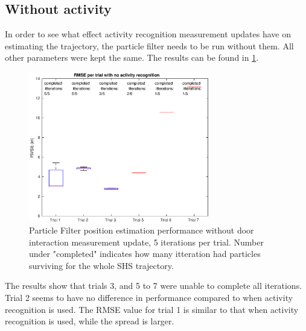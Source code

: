 \newpage
\subsection{Without activity}
In order to see what effect activity recognition measurement updates have on estimating the trajectory, the particle filter needs to be run without them. All other parameters were kept the same. The results can be found in \cref{fig:pf_boxplot_no_doors}.

\begin{figure}[H]
	\centering
	\includegraphics[width=0.7\textwidth]{images/20201118_1507_RMSE_per_trial_with_no_activity_recognition}
	\caption[Particle Filter position estimation performance without door interaction]{Particle Filter position estimation performance without door interaction measurement update, 5 iterations per trial. Number under "completed" indicates how many itteration had particles surviving for the whole SHS trajectory.}
	\label{fig:pf_boxplot_no_doors}
\end{figure}

The results show that trials 3, and 5 to 7 were unable to complete all iterations. Trial 2 seems to have no difference in performance compared to when activity recognition is used. The RMSE value for trial 1 is similar to that when activity recognition is used, while the spread is larger.


